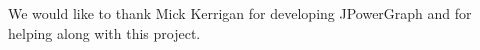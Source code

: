 \documentclass[a4paper,11pt]{article}
\begin{document}
We would like to thank Mick Kerrigan for developing JPowerGraph and for
helping along with this project.





{} %
\nocite{*} %

\clearpage




\end{document}

